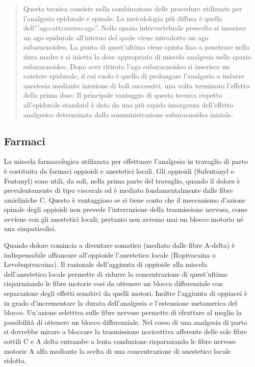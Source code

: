 \documentclass[]{article}
\begin{document}
\begin{quote}
Questa tecnica consiste nella combinazione delle procedure utilizzate
per l'analgesia epidurale e spinale. La metodologia più diffusa è quella
dell'''ago-attraverso-ago''. Nello spazio intervertebrale prescelto si
inserisce un ago epidurale all'interno del quale viene introdotto un ago
subaracnoideo. La punta di quest'ultimo viene spinta fino a penetrare
nella dura madre e si inietta la dose appropriata di miscela analgesia
nello spazio subaracnoideo. Dopo aver ritirato l'ago subaracnoideo si
inserisce un catetere epidurale, il cui ruolo è quello di prolungare
l'analgesia o indurre anestesia mediante iniezione di boli successivi,
una volta terminato l'effetto della prima dose. Il principale vantaggio
di questa tecnica rispetto all'epidurale standard è dato da una più
rapida insorgenza dell'effetto analgesico determinata dalla
somministrazione subaracnoidea iniziale.
\end{quote}

\hypertarget{farmaci}{%
\subsection{Farmaci}\label{farmaci}}

La miscela farmacologica utilizzata per effettuare l'analgesia in
travaglio di parto è costituita da farmaci oppioidi e anestetici locali.
Gli oppioidi (Sufentanyl o Fentanyl) sono utili, da soli, nella prima
parte del travaglio, quando il dolore è prevalentemente di tipo
viscerale ed è mediato fondamentalmente dalle fibre amieliniche C.
Questo è vantaggioso se si tiene conto che il meccanismo d'azione
spinale degli oppioidi non prevede l'interruzione della trasmissione
nervosa, come avviene con gli anestetici locali; pertanto non avremo mai
un blocco motorio né una simpaticolisi.

Quando dolore comincia a diventare somatico (mediato dalle fibre
A-delta) è indispensabile affiancare all'oppioide l'anestetico locale
(Ropivacaina o Levobupivacaina). Il razionale dell'aggiunta di oppioide
alla miscela dell'anestetico locale permette di ridurre la
concentrazione di quest'ultimo risparmiando le fibre motorie cosi da
ottenere un blocco differenziale con separazione degli effetti sensitivi
da quelli motori. Inoltre l'aggiunta di oppiacei è in grado
d'incrementare la durata dell'analgesia e l'estensione metamerica del
blocco. Un'azione selettiva sulle fibre nervose permette di sfruttare al
meglio la possibilità di ottenere un blocco differenziale. Nel corso di
una analgesia di parto si dovrebbe mirare a bloccare la trasmissione
nocicettiva afferente delle sole fibre sottili C e A delta entrambe a
lenta conduzione risparmiando le fibre nervose motorie A alfa mediante
la scelta di una concentrazione di anestetico locale ridotta.
\end{document}

